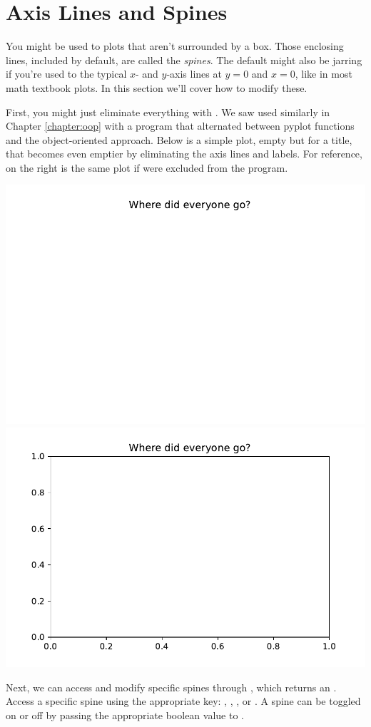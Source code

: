 \section{Axis Lines and Spines}\label{sec:axisSpines}

You might be used to plots that aren't surrounded by a box. Those enclosing lines, included by default, are called the \emph{spines}. The default might also be jarring if you're used to the typical $x$- and $y$-axis lines at $y=0$ and $x=0$, like in most math textbook plots. In this section we'll cover how to modify these. 

First, you might just eliminate everything with . We saw  used similarly in Chapter \ref{chapter:oop} with a program that alternated between pyplot functions and the object-oriented approach. Below is a simple plot, empty but for a title, that becomes even emptier by eliminating the axis lines and labels. For reference, on the right is the same plot if  were excluded from the program. 



\begin{center}
    \includegraphics[width = .45\textwidth]{figures/proseplots/no-axis.pdf}   \includegraphics[width = .45\textwidth]{figures/proseplots/yes-axis.pdf}  %
\end{center}


Next, we can access and modify specific spines through , which returns an . Access a specific spine using the appropriate key: , , , or .
A spine can be toggled on or off by passing the appropriate boolean value to .

